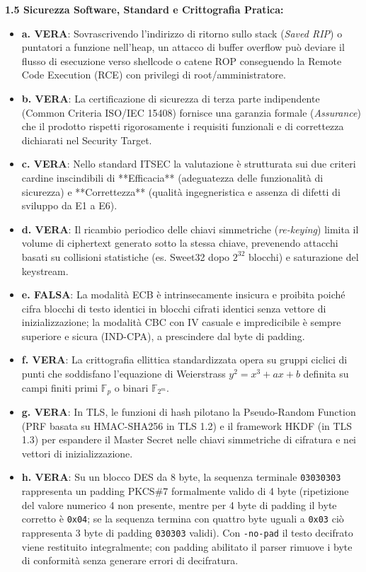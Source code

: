 \documentclass[11pt,a4paper]{article}
\begin{document}
\begin{solutionbox}
\textbf{1.5 Sicurezza Software, Standard e Crittografia Pratica:}
\begin{itemize}
    \item \textbf{a. VERA}: Sovrascrivendo l'indirizzo di ritorno sullo stack (\textit{Saved RIP}) o puntatori a funzione nell'heap, un attacco di buffer overflow pu\`o deviare il flusso di esecuzione verso shellcode o catene ROP conseguendo la Remote Code Execution (RCE) con privilegi di root/amministratore.
    \item \textbf{b. VERA}: La certificazione di sicurezza di terza parte indipendente (Common Criteria ISO/IEC 15408) fornisce una garanzia formale (\textit{Assurance}) che il prodotto rispetti rigorosamente i requisiti funzionali e di correttezza dichiarati nel Security Target.
    \item \textbf{c. VERA}: Nello standard ITSEC la valutazione \`e strutturata sui due criteri cardine inscindibili di **Efficacia** (adeguatezza delle funzionalit\`a di sicurezza) e **Correttezza** (qualit\`a ingegneristica e assenza di difetti di sviluppo da E1 a E6).
    \item \textbf{d. VERA}: Il ricambio periodico delle chiavi simmetriche (\textit{re-keying}) limita il volume di ciphertext generato sotto la stessa chiave, prevenendo attacchi basati su collisioni statistiche (es. Sweet32 dopo $2^{32}$ blocchi) e saturazione del keystream.
    \item \textbf{e. FALSA}: La modalit\`a ECB \`e intrinsecamente insicura e proibita poich\'e cifra blocchi di testo identici in blocchi cifrati identici senza vettore di inizializzazione; la modalit\`a CBC con IV casuale e impredicibile \`e sempre superiore e sicura (IND-CPA), a prescindere dal byte di padding.
    \item \textbf{f. VERA}: La crittografia ellittica standardizzata opera su gruppi ciclici di punti che soddisfano l'equazione di Weierstrass $y^2 = x^3 + ax + b$ definita su campi finiti primi $\mathbb{F}_p$ o binari $\mathbb{F}_{2^m}$.
    \item \textbf{g. VERA}: In TLS, le funzioni di hash pilotano la Pseudo-Random Function (PRF basata su HMAC-SHA256 in TLS 1.2) e il framework HKDF (in TLS 1.3) per espandere il Master Secret nelle chiavi simmetriche di cifratura e nei vettori di inizializzazione.
    \item \textbf{h. VERA}: Su un blocco DES da 8 byte, la sequenza terminale \texttt{03030303} rappresenta un padding PKCS\#7 formalmente valido di 4 byte (ripetizione del valore numerico 4 non presente, mentre per 4 byte di padding il byte corretto \`e \texttt{0x04}; se la sequenza termina con quattro byte uguali a \texttt{0x03} ci\`o rappresenta 3 byte di padding \texttt{030303} validi). Con \texttt{-no-pad} il testo decifrato viene restituito integralmente; con padding abilitato il parser rimuove i byte di conformit\`a senza generare errori di decifratura.
\end{itemize}
\end{solutionbox}
\end{document}
